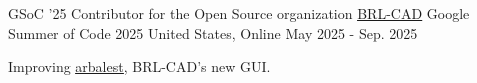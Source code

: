 

\begin{cventries}

  \cventry
    {GSoC '25 Contributor for the Open Source organization \underline{\href{https://github.com/BRL-CAD/brlcad}{BRL-CAD}}} %
    {Google Summer of Code 2025} %
    {United States, Online} %
    {May 2025 - Sep. 2025} %
    {
      \begin{cvitems} %
        \item {Improving \underline{\href{https://github.com/BRL-CAD/arbalest}{arbalest}}, BRL-CAD's new GUI.}
      \end{cvitems}
    }

\end{cventries}
